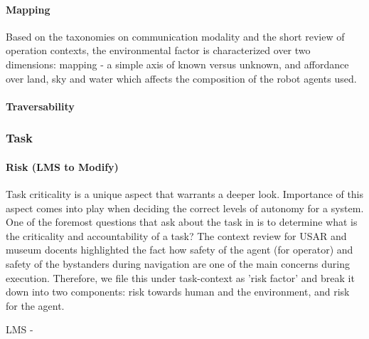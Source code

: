 \documentclass[letterpaper, 10 pt, conference]{ieeeconf}  %
\theoremstyle{definition}
\begin{document}
\paragraph{Mapping}
Based on the taxonomies on communication modality and the short review of operation contexts, the environmental factor is characterized over two dimensions: mapping - a simple axis of known versus unknown, and affordance over land, sky and water which affects the composition of the robot agents used.

\paragraph{Traversability}



\subsubsection{Task}
\paragraph{Risk (LMS to Modify)}
Task criticality is a unique aspect that warrants a deeper look.
Importance of this aspect comes into play when deciding the correct levels of autonomy for a system.
One of the foremost questions that \citeauthor{Beer2014toward} ask about the task in \cite{Beer2014toward} is to determine what is the criticality and accountability of a task?
The context review for USAR and museum docents highlighted the fact how safety of the agent (for operator) and safety of the bystanders during navigation are one of the main concerns during execution.
Therefore, we file this under task-context as 'risk factor' and break it down into two components: risk towards human and the environment, and risk for the agent. 

LMS - 
\end{document}

